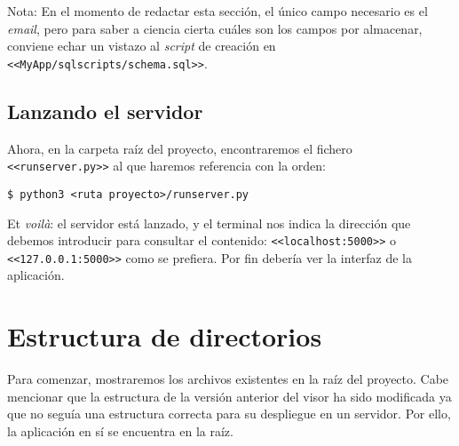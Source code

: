 Nota: En el momento de redactar esta sección, el único campo necesario es el \textit{email}, pero para saber a ciencia cierta cuáles son los campos por almacenar, conviene echar un vistazo al \textit{script} de creación en \texttt{<<MyApp/sql\textunderscore scripts\slash schema.sql>>}.

\subsection{Lanzando el servidor}
Ahora, en la carpeta raíz del proyecto, encontraremos el fichero \texttt{<<runserver.py>>} al que haremos referencia con la orden:

\noindent\verb|$ python3 <ruta proyecto>/runserver.py|

Et \textit{voilà}: el servidor está lanzado, y el terminal nos indica la dirección que debemos introducir para consultar el contenido: \texttt{<<localhost:5000>>} o \texttt{<<127.0.0.1:5000>>} como se prefiera. Por fin debería ver la interfaz de la aplicación.

\section{Estructura de directorios}
\noindent Para comenzar, mostraremos los archivos existentes en la raíz del proyecto. Cabe mencionar que la estructura de la versión anterior del visor ha sido modificada ya que no seguía una estructura correcta para su despliegue en un servidor. Por ello, la aplicación en sí se encuentra en la raíz.

